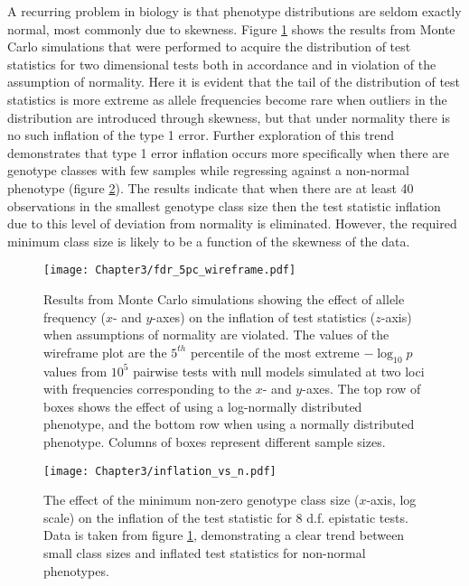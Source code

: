 A recurring problem in biology is that phenotype distributions are seldom exactly normal, most commonly due to skewness. Figure \ref{fig:mc_af} shows the results from Monte Carlo simulations that were performed to acquire the distribution of test statistics for two dimensional tests both in accordance and in violation of the assumption of normality. Here it is evident that the tail of the distribution of test statistics is more extreme as allele frequencies become rare when outliers in the distribution are introduced through skewness, but that under normality there is no such inflation of the type 1 error. Further exploration of this trend demonstrates that type 1 error inflation occurs more specifically when there are genotype classes with few samples while regressing against a non-normal phenotype (figure \ref{fig:mc_classsize}). The results indicate that when there are at least 40 observations in the smallest genotype class size then the test statistic inflation due to this level of deviation from normality is eliminated. However, the required minimum class size is likely to be a function of the skewness of the data.

\begin{figure}
\begin{center}
\texttt{[image: Chapter3/fdr\_5pc\_wireframe.pdf]}
\caption[Violation of assumptions of normality]{Results from Monte Carlo simulations showing the effect of allele frequency ($x$- and $y$-axes) on the inflation of test statistics ($z$-axis) when assumptions of normality are violated. The values of the wireframe plot are the $5^{th}$ percentile of the most extreme $-\log_{10}p$ values from $10^{5}$ pairwise tests with null models simulated at two loci with frequencies corresponding to the $x$- and $y$-axes. The top row of boxes shows the effect of using a log-normally distributed phenotype, and the bottom row when using a normally distributed phenotype. Columns of boxes represent different sample sizes.}
\label{fig:mc_af}
\end{center}
\end{figure}

\begin{figure}
\begin{center}
\texttt{[image: Chapter3/inflation\_vs\_n.pdf]}
\caption[Effect of minor class size on inflation]{The effect of the minimum non-zero genotype class size ($x$-axis, log scale) on the inflation of the test statistic for 8 d.f. epistatic tests. Data is taken from figure \ref{fig:mc_af}, demonstrating a clear trend between small class sizes and inflated test statistics for non-normal phenotypes.}
\label{fig:mc_classsize}
\end{center}
\end{figure}


